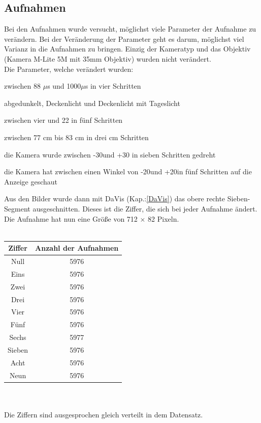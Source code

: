 \subsection{Aufnahmen}
Bei den Aufnahmen wurde versucht, möglichst viele Parameter der Aufnahme zu verändern.  Bei der Veränderung der Parameter geht es darum,  möglichst viel Varianz in die Aufnahmen zu bringen. Einzig der Kameratyp und das Objektiv  (Kamera M-Lite 5M mit 35mm Objektiv) wurden nicht verändert.\\
Die Parameter, welche verändert wurden:
\begin{description} \label{Parameter}
\item[Belichtungszeit:] zwischen 88 $\mu$s und 1000$\mu$s in vier Schritten
\item[Lichtverhältnisse:] abgedunkelt, Deckenlicht und Deckenlicht mit Tageslicht
\item[Blende:] zwischen vier und 22 in fünf Schritten
\item[Abstand:]zwischen 77 cm bis 83 cm in drei cm Schritten
\item[Neigung:] die Kamera wurde zwischen -30\textdegree und +30 \textdegree in sieben Schritten gedreht
\item[Blickwinkel:] die Kamera hat zwischen einen Winkel von -20\textdegree und +20\textdegree in fünf Schritten auf die Anzeige geschaut
\end{description}
Aus den Bilder wurde dann mit DaVis (Kap.:\ref{DaVis}) das obere rechte Sieben-Segment ausgeschnitten.  Dieses ist die Ziffer,  die sich bei jeder Aufnahme ändert.  Die Aufnahme hat nun eine Größe von  712 $\times$ 82 Pixeln.\\
\\
\begin{tabular}{c | c}
\centering
\textbf{Ziffer} & \textbf{Anzahl der Aufnahmen} \\ \hline
Null & 5976\\
Eins & 5976\\
Zwei & 5976\\
Drei & 5976\\
Vier & 5976\\
Fünf & 5976\\
Sechs & 5977\\
Sieben & 5976\\
Acht & 5976\\
Neun & 5976\\
\end{tabular}\\
\\
Die Ziffern sind ausgesprochen gleich verteilt in dem Datensatz.
